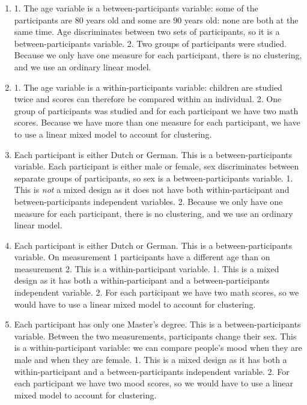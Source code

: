 \documentclass[]{report}\usepackage[]{graphicx}\usepackage[]{color}
\begin{document}
\begin{enumerate}

\item 

1. The age variable is a between-participants variable: some of the participants are 80 years old and some are 90 years old: none are both at the same time. Age discriminates between two sets of participants, so it is a between-participants variable.
2. Two groups of participants were studied. Because we only have one measure for each participant, there is no clustering, and we use an ordinary linear model.


\item
1. The age variable is a within-participants variable: children are studied twice and scores can therefore be compared within an individual.
2. One group of participants was studied and for each participant we have two math scores. Because we have more than one measure for each participant, we have to use a linear mixed model to account for clustering.

\item 
Each participant is either Dutch or German. This is a between-participants variable. Each participant is either male or female, sex discriminates between separate groups of participants, so sex is a between-participants variable.
1. This is \textit{not} a mixed design as it does not have both within-participant and between-participants independent variables. 
2. Because we only have one measure for each participant, there is no clustering, and we use an ordinary linear model.


\item 
Each participant is either Dutch or German. This is a between-participants variable.
On measurement 1 participants have a different age than on measurement 2. This is a within-participant variable.
1. This is a mixed design as it has both a within-participant and a between-participants independent variable. 
2. For each participant we have two math scores, so we would have to use a linear mixed model to account for clustering.

\item
Each participant has only one Master’s degree. This is a between-participants variable. Between the two measurements, participants change their sex. This is a within-participant variable: we can compare people's mood when they are male and when they are female.
1. This is a mixed design as it has both a within-participant and a between-participants independent variable. 
2. For each participant we have two mood scores, so we would have to use a linear mixed model to account for clustering.



\end{enumerate}
\end{document}
